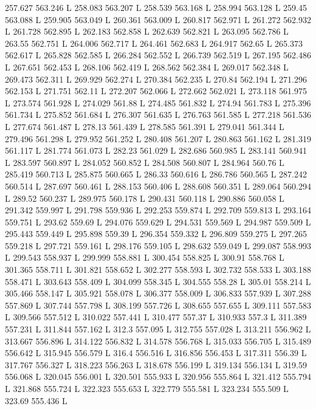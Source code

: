 257.627 563.246 L
258.083 563.207 L
258.539 563.168 L
258.994 563.128 L
259.45 563.088 L
259.905 563.049 L
260.361 563.009 L
260.817 562.971 L
261.272 562.932 L
261.728 562.895 L
262.183 562.858 L
262.639 562.821 L
263.095 562.786 L
263.55 562.751 L
264.006 562.717 L
264.461 562.683 L
264.917 562.65 L
265.373 562.617 L
265.828 562.585 L
266.284 562.552 L
266.739 562.519 L
267.195 562.486 L
267.651 562.453 L
268.106 562.419 L
268.562 562.384 L
269.017 562.348 L
269.473 562.311 L
269.929 562.274 L
270.384 562.235 L
270.84 562.194 L
271.296 562.153 L
271.751 562.11 L
272.207 562.066 L
272.662 562.021 L
273.118 561.975 L
273.574 561.928 L
274.029 561.88 L
274.485 561.832 L
274.94 561.783 L
275.396 561.734 L
275.852 561.684 L
276.307 561.635 L
276.763 561.585 L
277.218 561.536 L
277.674 561.487 L
278.13 561.439 L
278.585 561.391 L
279.041 561.344 L
279.496 561.298 L
279.952 561.252 L
280.408 561.207 L
280.863 561.162 L
281.319 561.117 L
281.774 561.073 L
282.23 561.029 L
282.686 560.985 L
283.141 560.941 L
283.597 560.897 L
284.052 560.852 L
284.508 560.807 L
284.964 560.76 L
285.419 560.713 L
285.875 560.665 L
286.33 560.616 L
286.786 560.565 L
287.242 560.514 L
287.697 560.461 L
288.153 560.406 L
288.608 560.351 L
289.064 560.294 L
289.52 560.237 L
289.975 560.178 L
290.431 560.118 L
290.886 560.058 L
291.342 559.997 L
291.798 559.936 L
292.253 559.874 L
292.709 559.813 L
293.164 559.751 L
293.62 559.69 L
294.076 559.629 L
294.531 559.569 L
294.987 559.509 L
295.443 559.449 L
295.898 559.39 L
296.354 559.332 L
296.809 559.275 L
297.265 559.218 L
297.721 559.161 L
298.176 559.105 L
298.632 559.049 L
299.087 558.993 L
299.543 558.937 L
299.999 558.881 L
300.454 558.825 L
300.91 558.768 L
301.365 558.711 L
301.821 558.652 L
302.277 558.593 L
302.732 558.533 L
303.188 558.471 L
303.643 558.409 L
304.099 558.345 L
304.555 558.28 L
305.01 558.214 L
305.466 558.147 L
305.921 558.078 L
306.377 558.009 L
306.833 557.939 L
307.288 557.869 L
307.744 557.798 L
308.199 557.726 L
308.655 557.655 L
309.111 557.583 L
309.566 557.512 L
310.022 557.441 L
310.477 557.37 L
310.933 557.3 L
311.389 557.231 L
311.844 557.162 L
312.3 557.095 L
312.755 557.028 L
313.211 556.962 L
313.667 556.896 L
314.122 556.832 L
314.578 556.768 L
315.033 556.705 L
315.489 556.642 L
315.945 556.579 L
316.4 556.516 L
316.856 556.453 L
317.311 556.39 L
317.767 556.327 L
318.223 556.263 L
318.678 556.199 L
319.134 556.134 L
319.59 556.068 L
320.045 556.001 L
320.501 555.933 L
320.956 555.864 L
321.412 555.794 L
321.868 555.724 L
322.323 555.653 L
322.779 555.581 L
323.234 555.509 L
323.69 555.436 L
